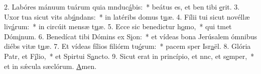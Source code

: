 2. Labóres mánuum tuárum quia mnduc\uline{á}bis:~* beátus es, et ben tibi \uline{e}rit.
3. Uxor tua sicut vits ab\uline{ú}ndans:~* in latéribs domus t\uline{u}æ.
4. Fílii tui sicut novéllæ liv\uline{á}rum:~* in circúit mensæ t\uline{u}æ.
5. Ecce sic benedictur h\uline{o}mo,~* qui tmet Dóm\uline{i}num.
6. Benedícat tibi Dómins ex S\uline{i}on:~* et vídeas bona Jerúsalem ómnibus diébs vitæ t\uline{u}æ.
7. Et vídeas fílios filiórm tu\uline{ó}rum:~* pacem sper Isr\uline{a}ël.
8. Glória Patr, et F\uline{í}lio,~* et Spirtui S\uline{a}ncto.
9. Sicut erat in princípio, et nnc, et s\uline{e}mper,~* et in sǽcula sæclórum. \uline{A}men.
